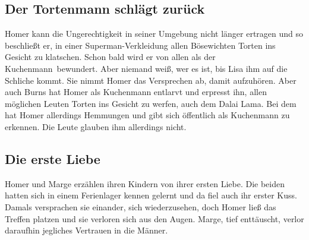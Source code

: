 

\subsection{Der Tortenmann schlägt zurück}\label{FABF15}
Homer kann die Ungerechtigkeit in seiner Umgebung nicht länger ertragen und so beschließt er, in einer Superman-Verkleidung allen Bösewichten Torten ins Gesicht zu klatschen. Schon bald wird er von allen als der \glqq Kuchenmann\grqq\ bewundert. Aber niemand weiß, wer es ist, bis Lisa ihm auf die Schliche kommt. Sie nimmt Homer das Versprechen ab, damit aufzuhören. Aber auch Burns hat Homer als Kuchenmann entlarvt und erpresst ihn, allen möglichen Leuten Torten ins Gesicht zu werfen, auch dem Dalai Lama. Bei dem hat Homer allerdings Hemmungen und gibt sich öffentlich als Kuchenmann zu erkennen. Die Leute glauben ihm allerdings nicht.


\subsection{Die erste Liebe}\label{FABF13}
Homer und Marge erzählen ihren Kindern von ihrer ersten Liebe. Die beiden hatten sich in einem Ferienlager kennen gelernt und da fiel auch ihr erster Kuss. Damals versprachen sie einander, sich wiederzusehen, doch Homer ließ das Treffen platzen und sie verloren sich aus den Augen. Marge, tief enttäuscht, verlor daraufhin jegliches Vertrauen in die Männer.

